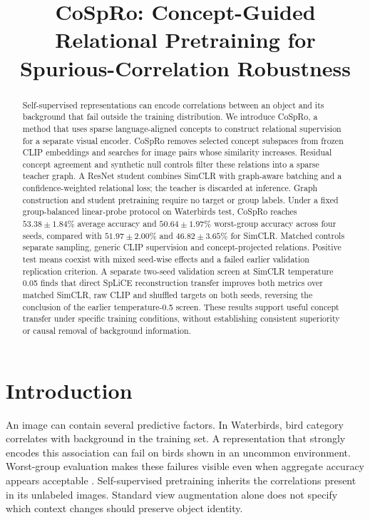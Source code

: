 \documentclass{article}
\title{CoSpRo: Concept-Guided\\Relational Pretraining for\\Spurious-Correlation Robustness}
\author{}
\begin{document}
\maketitle
\raggedbottom
\begin{abstract}
Self-supervised representations can encode correlations between an object and
its background that fail outside the training distribution. We introduce
CoSpRo, a method that uses sparse language-aligned concepts to construct
relational supervision for a separate visual encoder. CoSpRo removes selected
concept subspaces from frozen CLIP embeddings and searches for image pairs
whose similarity increases. Residual concept agreement and synthetic null
controls filter these relations into a sparse teacher graph. A ResNet student
combines SimCLR with graph-aware batching and a confidence-weighted relational
loss; the teacher is discarded at inference. Graph construction and student
pretraining require no target or group labels. Under a fixed group-balanced
linear-probe protocol on Waterbirds test, CoSpRo reaches $53.38\pm1.84\%$
average accuracy and $50.64\pm1.97\%$ worst-group accuracy across four seeds,
compared with $51.97\pm2.00\%$ and $46.82\pm3.65\%$ for SimCLR. Matched
controls separate sampling, generic CLIP supervision and concept-projected
relations. Positive test means coexist with mixed seed-wise effects and a
failed earlier validation replication criterion. A separate two-seed
validation screen at SimCLR temperature 0.05 finds that direct SpLiCE
reconstruction transfer improves both metrics over matched SimCLR, raw CLIP
and shuffled targets on both seeds, reversing the conclusion of the earlier
temperature-0.5 screen. These results support useful concept transfer under
specific training conditions, without establishing consistent superiority or
causal removal of background information.
\end{abstract}

\section{Introduction}
An image can contain several predictive factors. In Waterbirds, bird category
correlates with background in the training set. A representation that strongly
encodes this association can fail on birds shown in an uncommon environment.
Worst-group evaluation makes these failures visible even when aggregate accuracy
appears acceptable \citep{sagawa2020groupdro}. Self-supervised pretraining inherits
the correlations present in its unlabeled images. Standard view augmentation
alone does not specify which context changes should preserve object identity.
\end{document}
